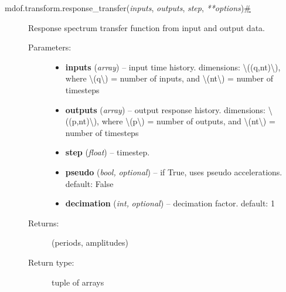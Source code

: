\begin{description}
\item[{ {{mdof.transform.}}{{response\_transfer}}{(}\emph{{{inputs}}},
\emph{{{outputs}}}, \emph{{{step}}},
\emph{{{**}}{{options}}}{)}\protect\hyperlink{mdof.transform.response_transfer}{\#}}]
Response spectrum transfer function from input and output data.

\begin{description}
\item[Parameters{:}]
\begin{itemize}
\item
  \textbf{inputs} (\emph{array}) -- input time history. dimensions:
  {\textbackslash{}((q,nt)\textbackslash{})}, where
  {\textbackslash{}(q\textbackslash{})} = number of inputs, and
  {\textbackslash{}(nt\textbackslash{})} = number of timesteps
\item
  \textbf{outputs} (\emph{array}) -- output response history.
  dimensions: {\textbackslash{}((p,nt)\textbackslash{})}, where
  {\textbackslash{}(p\textbackslash{})} = number of outputs, and
  {\textbackslash{}(nt\textbackslash{})} = number of timesteps
\item
  \textbf{step} (\emph{float}) -- timestep.
\item
  \textbf{pseudo} (\emph{bool,} \emph{optional}) -- if True, uses pseudo
  accelerations. default: False
\item
  \textbf{decimation} (\emph{int,} \emph{optional}) -- decimation
  factor. default: 1
\end{itemize}
\item[Returns{:}]
(periods, amplitudes)
\item[Return type{:}]
tuple of arrays
\end{description}
\end{description}

